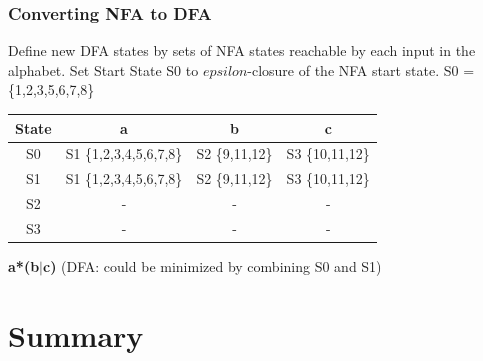 \documentclass{beamer}
\def\dx{1cm} \def\dy{1.5cm}
\newcommand{\newState}[4]{\node[state,#3](#1)[#4]{#2};}
\newcommand{\newTransition}[4]{\path[->] (#1) edge [#4] node {#3} (#2);}
\begin{document}
\begin{frame}
\frametitle{Converting NFA to DFA}
\footnotesize{ Define new DFA states by sets of NFA states reachable by each input in the alphabet.
Set Start State S0 to $epsilon$-closure of the NFA start state. S0 = \{1,2,3,5,6,7,8\}}

\vspace{0.5cm}

\begin{tabular}{c|ccc}
State & a & b & c \\
\hline
S0  & S1 \{1,2,3,4,5,6,7,8\} & S2 \{9,11,12\} & S3 \{10,11,12\}\\
S1  & S1 \{1,2,3,4,5,6,7,8\} & S2 \{9,11,12\} & S3 \{10,11,12\}\\
 S2 & - & - & -  \\
 S3 & - &- &-  \\
 \hline
\end{tabular}

\vspace{0.3cm}
 \textbf{a*(b$\vert$c)} (DFA: could be minimized by combining S0 and S1)

    \begin{center}
        \end{center}

\end{frame}

\section{Summary}
\end{document}
